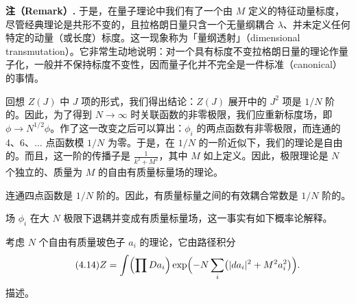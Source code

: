 \textbf{注（Remark）.} 于是，在量子理论中我们有了一个由 $M$ 定义的特征动量标度，尽管经典理论是共形不变的，且拉格朗日量只含一个无量纲耦合 $\lambda$、并未定义任何特定的动量（或长度）标度。这一现象称为「量纲透射」（dimensional transmutation）。它非常生动地说明：对一个具有标度不变拉格朗日量的理论作量子化，一般并不保持标度不变性，因而量子化并不完全是一件标准（canonical）的事情。

回想 $Z(J)$ 中 $J$ 项的形式，我们得出结论：$Z(J)$ 展开中的 $J^2$ 项是 $1/N$ 阶的。因此，为了得到 $N\to\infty$ 时关联函数的非零极限，我们应重新标度场，即 $\phi\to N^{1/2}\phi$。作了这一改变之后可以算出：$\phi_i$ 的两点函数有非零极限，而连通的 4、6、$\dots$ 点函数模 $1/N$ 为零。于是，在 $1/N$ 的一阶近似下，我们的理论是自由的。而且，这一阶的传播子是 $\frac{1}{k^2+M^2}$，其中 $M$ 如上定义。因此，极限理论是 $N$ 个独立的、质量为 $M$ 的自由有质量标量场的理论。

连通四点函数是 $1/N$ 阶的。因此，有质量标量之间的有效耦合常数是 $1/N$ 阶的。

场 $\phi_i$ 在大 $N$ 极限下退耦并变成有质量标量场，这一事实有如下概率论解释。

考虑 $N$ 个自由有质量玻色子 $a_i$ 的理论，它由路径积分
\begin{equation}
  \tag{4.14}
  \label{eq:4-14}
  Z=\int\Bigl(\prod Da_i\Bigr)\exp\Bigl(-N\sum_i\bigl(|da_i|^2+M^2a_i^2\bigr)\Bigr).
\end{equation}
描述。




